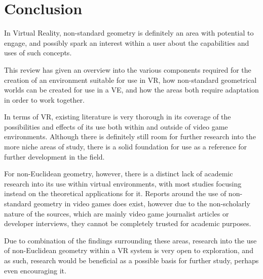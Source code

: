 \section{Conclusion}
\label{lr:conclusion}

	In Virtual Reality, non-standard geometry is definitely an area with potential to engage, and possibly spark an interest within a user about the capabilities and uses of such concepts.

	This review has given an overview into the various components required for the creation of an environment suitable for use in VR, how non-standard geometrical worlds can be created for use in a VE, and how the areas both require adaptation in order to work together.

	In terms of VR, existing literature is very thorough in its coverage of the possibilities and effects of its use both within and outside of video game environments.
	Although there is definitely still room for further research into the more niche areas of study, there is a solid foundation for use as a reference for further development in the field.

	For non-Euclidean geometry, however, there is a distinct lack of academic research into its use within virtual environments, with most studies focusing instead on the theoretical applications for it.
	Reports around the use of non-standard geometry in video games does exist, however due to the non-scholarly nature of the sources, which are mainly video game journalist articles or developer interviews, they cannot be completely trusted for academic purposes.

	Due to combination of the findings surrounding these areas, research into the use of non-Euclidean geometry within a VR system is very open to exploration, and as such, research would be beneficial as a possible basis for further study, perhaps even encouraging it.
